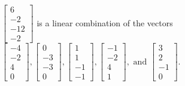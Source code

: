\begin{exercise}
\begin{exerciseStatement}
  \end{exerciseStatement}
  \begin{exerciseAnswer}
   \(\left[\begin{array}{c}
6 \\
-2 \\
-12 \\
-2
\end{array}\right]\) 
  	 is  
	a linear combination of the vectors \(\left[\begin{array}{c}
-4 \\
-2 \\
4 \\
0
\end{array}\right] , \left[\begin{array}{c}
0 \\
-3 \\
-3 \\
0
\end{array}\right] , \left[\begin{array}{c}
1 \\
1 \\
-1 \\
-1
\end{array}\right] , \left[\begin{array}{c}
-1 \\
-2 \\
4 \\
1
\end{array}\right] , \text{ and } \left[\begin{array}{c}
3 \\
2 \\
-1 \\
0
\end{array}\right]\).

	
  


  \end{exerciseAnswer}
\end{exercise}